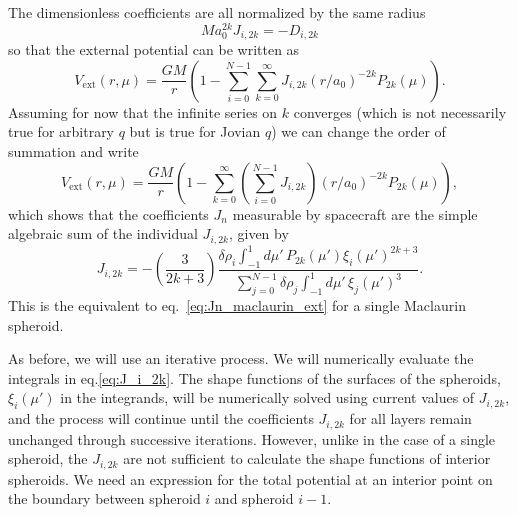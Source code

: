 \documentclass[amsmath,amsfonts,rmp,letterpaper]{revtex4}
\newcommand{\sub}[1]{_{\text{#1}}} %
\renewcommand{\inf}{\infty}
\newcommand{\ptk}{P_{2k}}
\newcommand{\sumonk}{\sum_{k=0}^{\inf}}
\newcommand{\sumoni}{\sum_{i=0}^{N-1}}
\newcommand{\dro}{\delta\rho}
\newcommand{\intonmu}{\int_{-1}^{1}}
\begin{document}
The dimensionless coefficients are all normalized by the same radius
\begin{equation}
Ma_0^{2k}J_{i,2k} = -D_{i,2k}
\end{equation}
so that the external potential can be written as
\begin{equation}
V\sub{ext}(r,\mu) = \frac{GM}{r}\left(1 -
\sumoni\sumonk{}J_{i,2k}(r/a_0)^{-2k}\ptk(\mu)\right).
\end{equation}
Assuming for now that the infinite series on $k$ converges (which is not
necessarily true for arbitrary $q$ but is true for Jovian $q$) we can change the
order of summation and write
\begin{equation}
V\sub{ext}(r,\mu) = \frac{GM}{r}\left(1 -
\sumonk\left(\sumoni{}J_{i,2k}\right)(r/a_0)^{-2k}\ptk(\mu)\right),
\end{equation}
which shows that the coefficients $J_n$ measurable by spacecraft are the simple
algebraic sum of the individual $J_{i,2k}$, given by
\begin{equation}\label{eq:J_i_2k}
J_{i,2k} = -\left(\frac{3}{2k + 3}\right)
\frac{\dro_i\intonmu{d}\mu'\,\ptk(\mu')\xi_i(\mu')^{2k + 3}}
{\sum_{j=0}^{N-1}\dro_j\intonmu{d}\mu'\,\xi_j(\mu')^3}.
\end{equation}
This is the equivalent to eq.~\eqref{eq:Jn_maclaurin_ext} for a single Maclaurin
spheroid.

As before, we will use an iterative process. We will numerically evaluate the
integrals in eq.\eqref{eq:J_i_2k}. The shape functions of the surfaces of the
spheroids, $\xi_i(\mu')$ in the integrands, will be numerically solved using
current values of $J_{i,2k}$, and the process will continue until the coefficients
$J_{i,2k}$ for all layers remain unchanged through successive iterations. However,
unlike in the case of a single spheroid, the $J_{i,2k}$ are not sufficient to
calculate the shape functions of interior spheroids. We need an expression for the
total potential at an interior point on the boundary between spheroid $i$ and
spheroid $i-1$.
\end{document}
